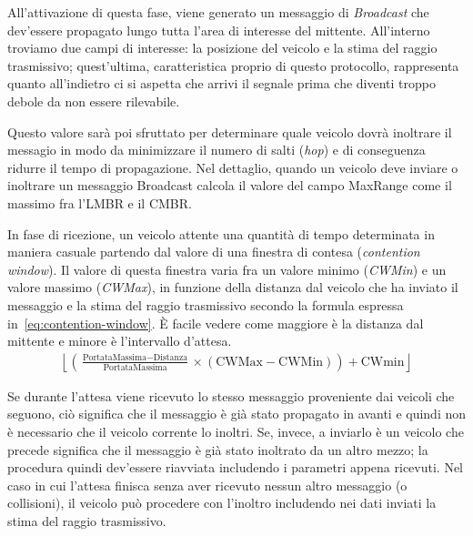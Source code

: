 All'attivazione di questa fase, viene generato un messaggio di \textit{Broadcast} che dev'essere propagato lungo tutta l'area di interesse del mittente.
All'interno troviamo due campi di interesse: la posizione del veicolo e la stima del raggio trasmissivo; quest'ultima, caratteristica proprio di questo protocollo,
rappresenta quanto all'indietro ci si aspetta che arrivi il segnale prima che diventi troppo debole da non essere rilevabile.

Questo valore sarà poi sfruttato per determinare quale veicolo dovrà inoltrare il messagio in modo da minimizzare il numero di salti (\textit{hop}) e di conseguenza
ridurre il tempo di propagazione.
Nel dettaglio, quando un veicolo deve inviare o inoltrare un messaggio Broadcast calcola il valore del campo MaxRange come il massimo fra l'LMBR e il CMBR.

In fase di ricezione, un veicolo attente una quantità di tempo determinata in maniera casuale partendo dal valore di una finestra di contesa (\textit{contention window}).
Il valore di questa finestra varia fra un valore minimo (\textit{CWMin}) e un valore massimo (\textit{CWMax}), in funzione della distanza dal veicolo che ha inviato il messaggio
e la stima del raggio trasmissivo secondo la formula espressa in~\ref{eq:contention-window}.
È facile vedere come maggiore è la distanza dal mittente e minore è l'intervallo d'attesa.
\begin{gather}\label{eq:contention-window}
	\left\lfloor \left( \frac{\text{PortataMassima} - \text{Distanza}}{\text{PortataMassima}} \times (\text{CWMax} - \text{CWMin}) \right) + \text{CWmin}  \right\rfloor
\end{gather}

Se durante l'attesa viene ricevuto lo stesso messaggio proveniente dai veicoli che seguono, ciò significa che il messaggio è già stato propagato in avanti e quindi non è necessario
che il veicolo corrente lo inoltri.
Se, invece, a inviarlo è un veicolo che precede significa che il messaggio è già stato inoltrato da un altro mezzo; la procedura quindi dev'essere riavviata includendo i parametri appena ricevuti.
Nel caso in cui l'attesa finisca senza aver ricevuto nessun altro messaggio (o collisioni), il veicolo può procedere con l'inoltro includendo nei dati inviati la stima del raggio trasmissivo.

